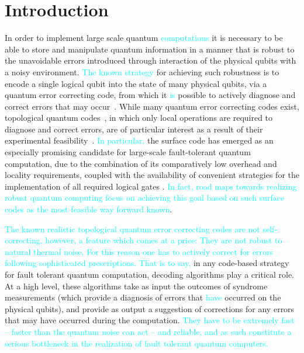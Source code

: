 \documentclass[twocolumn,preprintnumbers,amsmath,amssymb,notitlepage,nofootinbib,longbibliography,superscriptaddress,aps,pra,10pt]{revtex4-1}
\newcommand{\je}[1]{\textcolor{cyan}{#1}}
\begin{document}
\section{Introduction}\label{s:introduction}
	In order to implement large scale quantum \je{computations} it is necessary to be able to store and manipulate quantum information in a manner that is robust to the unavoidable errors introduced through interaction of the physical qubits with a noisy environment.
	\je{The known strategy} for achieving such robustness is to encode a single logical qubit into the state of many physical qubits, via a quantum error correcting code, from which it 
	\je{is} possible to actively diagnose and correct errors that may occur~\cite{Terhal15,Campbell17}.
	While many quantum error correcting codes exist, topological quantum codes~\cite{Kitaev03, Dennis02, Preskill17lectures, Nayak08, Pachos12, Terhal15, Brown16, Campbell17}, in which only local operations are required to diagnose and correct errors, are of particular interest as a result of their experimental feasibility~\cite{Reed12, Barends14, Nigg14, Corcoles15, Albrecht16, Takita16, Linke17}.
	\je{In particular,} the surface code has emerged as an especially promising candidate for large-scale fault-tolerant quantum computation, due to the combination of its comparatively low overhead and locality requirements, coupled with the availability of convenient strategies for the implementation of all required logical gates \cite{Fowler18,Litinski18b}. \je{In fact, road maps towards realizing robust quantum computing focus on achieving this goal based on such surface codes as the 
	most feasible way forward known}.

	\je{The known realistic topological quantum error correcting codes are not self-correcting, however, a feature which comes at a price: They are not robust
	to natural thermal noise. For this reason one has to actively correct for errors following sophisticated prescriptions. That is to say,} in any code-based strategy for fault tolerant quantum computation, decoding algorithms play a critical role.
	At a high level, these algorithms take as input the outcomes of syndrome measurements (which provide a diagnosis of errors that \je{have} occurred on the physical qubits), and provide as output a suggestion of corrections for any errors that may have occurred during the computation. \je{They have to be extremely 
	fast -- faster than the quantum noise can act -- and reliable,
	and as such constitute a serious bottleneck in the realization of fault tolerant quantum computers.}
\end{document}
